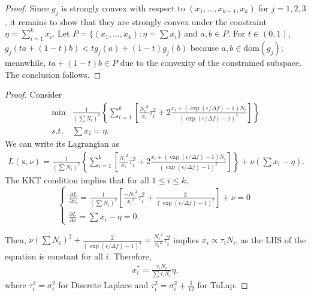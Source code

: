 \documentclass{article}
\theoremstyle{definition}
\begin{document}
\begin{proof}
    Since $g_j$ is strongly convex with respect to $(x_1,\ldots,x_{k-1}, x_k)$ for $j=1,2,3$, it remains to show that they are strongly convex under the constraint $\eta = \sum_{i=1}^k x_i$. Let $P = \{ (x_1,\ldots,x_k): \eta = \sum x_i \}$ and $a, b \in P$. For $t \in (0,1)$, $g_j (ta + (1-t)b) < t g_j (a) + (1-t) g_j (b)$ because $a, b \in \mathrm{dom}(g_j)$; meanwhile, $ta + (1-t)b \in P$ due to the convexity of the constrained subspace. The conclusion follows.
\end{proof}

\closedFormSolution*

\begin{proof}
Consider 
\begin{align*}
    \min& \frac{1}{(\sum N_i)^2} \left\{ \sum_{i=1}^k \left[ \frac{{N_i}^2}{x_i} \tau_i^2 + 2 \frac{x_i + (\exp{(\epsilon / \Delta f)}-1) N_i}{(\exp{(\epsilon / \Delta f)}-1)^2} \right] \right\} \\
    s.t.& \sum x_i = \eta.
\end{align*}
We can write its Lagrangian as
\begin{align*}
    L(\mathrm{x}, \nu) = \frac{1}{(\sum N_i)^2} \left\{ \sum_{i=1}^k \left[ \frac{{N_i}^2}{x_i} \tau_i^2 + 2 \frac{x_i + (\exp{(\epsilon / \Delta f)}-1) N_i}{(\exp{(\epsilon / \Delta f)}-1)^2} \right] \right\} + \nu (\sum x_i - \eta).
\end{align*}
The KKT condition implies that for all $1\leq i \leq k$,
\begin{equation*}
    \begin{cases}
        \frac{\partial L}{\partial x_i} = \frac{1}{(\sum N_i)^2} \left[ \frac{-{N_i}^2}{{x_i}^2} \tau_i^2 + \frac{2}{(\exp{(\epsilon / \Delta f)}-1)^2} \right] + \nu = 0 \\
        \frac{\partial L}{\partial \nu} = \sum x_i - \eta = 0.
    \end{cases}    
\end{equation*}

Then, $\nu (\sum N_i)^2 + \frac{2}{(\exp{(\epsilon / \Delta f)}-1)^2} = \frac{{N_i}^2}{{x_i}^2} \tau_i^2$ implies $x_i \propto \tau_i N_i$, as the LHS of the equation is constant for all $i$. Therefore,
\begin{align*}
    x_i^* = \frac{\tau_i N_i}{\sum \tau_i N_i} \eta, 
\end{align*}
where $\tau_i^2 = \sigma_i^2$ for Discrete Laplace and $\tau_i^2 = \sigma_i^2 + \frac{1}{12}$ for TuLap. 
\end{proof}
\end{document}
